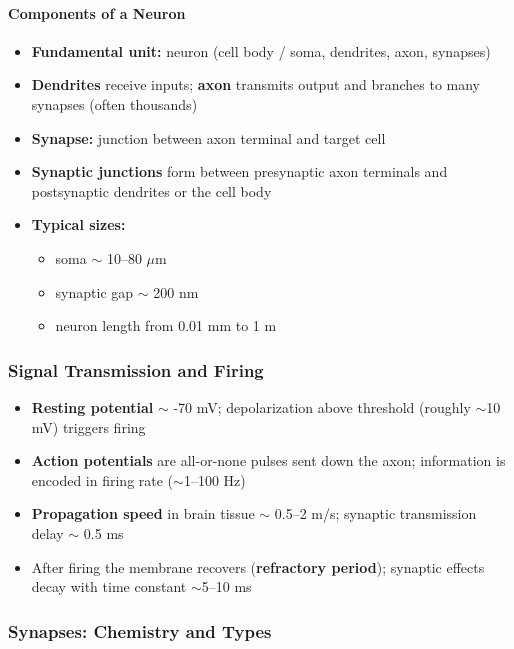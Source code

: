 \paragraph{Components of a Neuron}

\begin{itemize}
\item \textbf{Fundamental unit:} neuron (cell body / soma, dendrites, axon, synapses)
\item \textbf{Dendrites} receive inputs; \textbf{axon} transmits output and branches to many synapses (often thousands)
\item \textbf{Synapse:} junction between axon terminal and target cell
\item \textbf{Synaptic junctions} form between presynaptic axon terminals and postsynaptic dendrites or the cell body
\item \textbf{Typical sizes:}
\begin{itemize}
\item soma $\sim$ 10–80 $\mu$m
\item synaptic gap $\sim$ 200 nm
\item neuron length from 0.01 mm to 1 m
\end{itemize}
\end{itemize}

\subsubsection{Signal Transmission and Firing}

\begin{itemize}
\item \textbf{Resting potential} $\sim$ -70 mV; depolarization above threshold (roughly $\sim$10 mV) triggers firing
\item \textbf{Action potentials} are all-or-none pulses sent down the axon; information is encoded in firing rate ($\sim$1–100 Hz)
\item \textbf{Propagation speed} in brain tissue $\sim$ 0.5–2 m/s; synaptic transmission delay $\sim$ 0.5 ms
\item After firing the membrane recovers (\textbf{refractory period}); synaptic effects decay with time constant $\sim$5–10 ms
\end{itemize}

\subsubsection{Synapses: Chemistry and Types}

